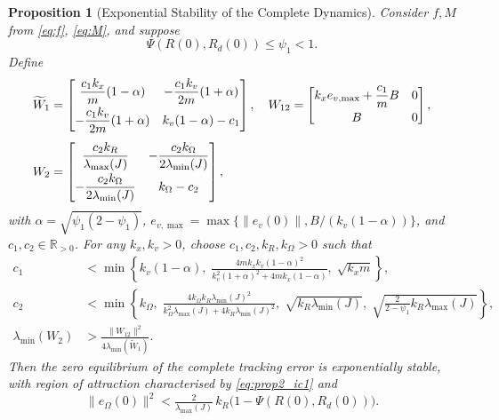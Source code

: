 \documentclass[11pt]{article}
\newtheorem{proposition}{Proposition}
\theoremstyle{remark}
\newcommand{\R}{\mathbb{R}}
\newcommand{\lmin}{\lambda_{\min}}
\newcommand{\lmax}{\lambda_{\max}}
\begin{document}
\begin{proposition}[Exponential Stability of the Complete Dynamics]
\label{prop:2}
Consider $f, M$ from \eqref{eq:f}, \eqref{eq:M}, and suppose
\begin{equation}
    \Psi(R(0), R_d(0)) \leq \psi_1 < 1. \label{eq:prop2_ic1}
\end{equation}
Define
\begin{align}
\widetilde W_1 &=
\begin{bmatrix}
\dfrac{c_1 k_x}{m}(1-\alpha) & -\dfrac{c_1 k_v}{2m}(1+\alpha) \\[6pt]
-\dfrac{c_1 k_v}{2m}(1+\alpha) & k_v(1-\alpha)-c_1
\end{bmatrix},\quad
W_{12} =
\begin{bmatrix}
k_x e_{v,\max} + \dfrac{c_1}{m} B & 0 \\[6pt]
B & 0
\end{bmatrix},\notag\\[4pt]
W_2 &=
\begin{bmatrix}
\dfrac{c_2 k_R}{\lmax(J)} & -\dfrac{c_2 k_\Omega}{2\lmin(J)} \\[8pt]
-\dfrac{c_2 k_\Omega}{2\lmin(J)} & k_\Omega - c_2
\end{bmatrix},\label{eq:W1_tilde}
\end{align}
with $\alpha = \sqrt{\psi_1(2-\psi_1)}$, $e_{v,\max} = \max\{\|e_v(0)\|, B/(k_v(1-\alpha))\}$, and $c_1, c_2 \in \R_{>0}$. For any $k_x, k_v > 0$, choose $c_1, c_2, k_R, k_\Omega > 0$ such that
\begin{align}
c_1 &< \min\left\{ k_v(1-\alpha),\; \tfrac{4mk_xk_v(1-\alpha)^2}{k_v^2(1+\alpha)^2 + 4mk_x(1-\alpha)},\; \sqrt{k_x m}\right\}, \label{eq:c1_cond}\\[4pt]
c_2 &< \min\left\{k_\Omega,\; \tfrac{4k_\Omega k_R \lmin(J)^2}{k_\Omega^2\lmax(J) + 4k_R\lmin(J)^2},\; \sqrt{k_R\lmin(J)},\; \sqrt{\tfrac{2}{2-\psi_1}k_R\lmax(J)}\right\}, \label{eq:c2_cond_prop2}\\[4pt]
\lmin(W_2) &> \tfrac{\|W_{12}\|^2}{4\lmin(\widetilde W_1)}. \label{eq:W_cond}
\end{align}
Then the zero equilibrium of the complete tracking error is exponentially stable, with region of attraction characterised by \eqref{eq:prop2_ic1} and
\begin{equation}
    \|e_\Omega(0)\|^2 < \tfrac{2}{\lmax(J)}\,k_R\bigl(1-\Psi(R(0),R_d(0))\bigr).
    \label{eq:prop2_ic2}
\end{equation}
\end{proposition}
\end{document}
